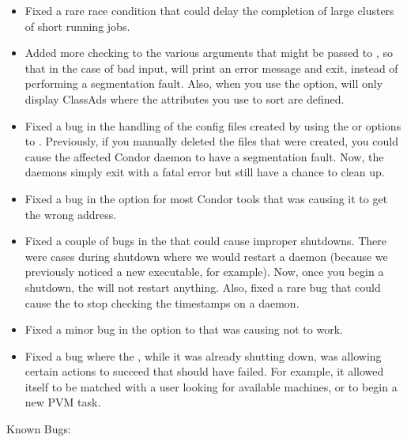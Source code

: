 \begin{itemize}
\item Fixed a rare race condition that could delay the completion of
large clusters of short running jobs. 

\item Added more checking to the various arguments that might be
passed to , so that in the case of bad input,
 will print an error message and exit, instead of
performing a segmentation fault.
Also, when you use the  option,  will only
display ClassAds where the attributes you use to sort are defined.

\item Fixed a bug in the handling of the config files created by
using the  or  options to .
Previously, if you manually deleted the files that were created, you
could cause the affected Condor daemon to have a segmentation fault.
Now, the daemons simply exit with a fatal error but still have a
chance to clean up.

\item Fixed a bug in the  option for most Condor
tools that was causing it to get the wrong address.

\item Fixed a couple of bugs in the  that could cause
improper shutdowns. 
There were cases during shutdown where we would restart a daemon
(because we previously noticed a new executable, for example).
Now, once you begin a shutdown, the  will not restart
anything. 
Also, fixed a rare bug that could cause the  to stop
checking the timestamps on a daemon.

\item Fixed a minor bug in the  option to
 that was causing  not to work.

\item Fixed a bug where the , while it was already
shutting down, was allowing certain actions to succeed that should
have failed.
For example, it allowed itself to be matched with a user looking for
available machines, or to begin a new PVM task.

\end{itemize}

\noindent Known Bugs:

